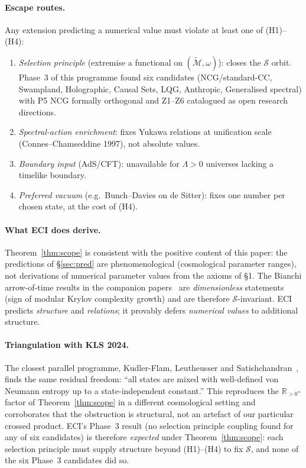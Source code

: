 \documentclass[reprint,amsmath,amssymb,aps,prd,superscriptaddress]{revtex4-2}
\providecommand{\1}{\mathbf{1}}
\begin{document}
\paragraph{Escape routes.} Any extension predicting a numerical
value must violate at least one of (H1)--(H4):
\begin{enumerate}
\item \emph{Selection principle} (extremise a functional on
      $(\widetilde{\mathcal{M}},\omega)$): closes the $\mathcal{S}$
      orbit. Phase~3 of this programme found six candidates
      (NCG/standard-CC, Swampland, Holographic, Causal Sets, LQG,
      Anthropic, Generalised spectral) with P5 NCG formally orthogonal
      and Z1--Z6 catalogued as open research directions.
\item \emph{Spectral-action enrichment}: fixes Yukawa relations at
      unification scale (Connes--Chamseddine 1997), not absolute values.
\item \emph{Boundary input} (AdS/CFT): unavailable for $\Lambda>0$
      universes lacking a timelike boundary.
\item \emph{Preferred vacuum} (e.g.\ Bunch--Davies on de Sitter):
      fixes one number per chosen state, at the cost of (H4).
\end{enumerate}

\paragraph{What ECI does derive.} Theorem~\ref{thm:scope} is
consistent with the positive content of this paper: the predictions
of \S\ref{sec:pred} are phenomenological (cosmological parameter
ranges), not derivations of numerical parameter values from the
axioms of \S1. The Bianchi arrow-of-time results in the companion
papers~\cite{CLPW2023} are \emph{dimensionless} statements (sign of
modular Krylov complexity growth) and are therefore
$\mathcal{S}$-invariant. ECI predicts \emph{structure} and
\emph{relations}; it provably defers \emph{numerical values} to
additional structure.

\paragraph{Triangulation with KLS 2024.} The closest parallel
programme, Kudler-Flam, Leutheusser and Satishchandran~\cite{KFLS2024},
finds the same residual freedom: ``all states are mixed with
well-defined von Neumann entropy up to a state-independent constant.''
This reproduces the $\mathbb{R}_{>0}$-factor of
Theorem~\ref{thm:scope} in a different cosmological setting and
corroborates that the obstruction is structural, not an artefact of
our particular crossed product. ECI's Phase~3 result
(no selection principle coupling found for any of six candidates)
is therefore \emph{expected} under Theorem~\ref{thm:scope}: each
selection principle must supply structure beyond (H1)--(H4) to fix
$\mathcal{S}$, and none of the six Phase~3 candidates did so.
\end{document}
